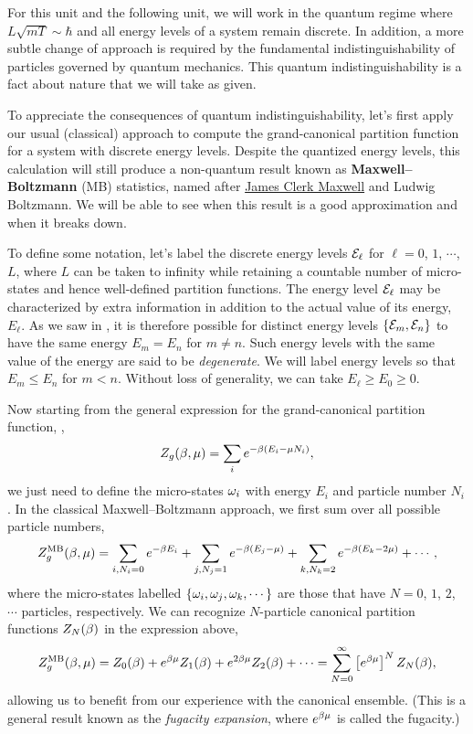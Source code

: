 For this unit and the following unit, we will work in the quantum regime where $L\sqrt{mT} \sim \hbar$ and all energy levels of a system remain discrete.
In addition, a more subtle change of approach is required by the fundamental indistinguishability of particles governed by quantum mechanics.
This quantum indistinguishability is a fact about nature that we will take as given.

To appreciate the consequences of quantum indistinguishability, let's first apply our usual (classical) approach to compute the grand-canonical partition function for a system with discrete energy levels.
Despite the quantized energy levels, this calculation will still produce a non-quantum result known as \textbf{Maxwell--Boltzmann} (MB) statistics, named after \href{https://en.wikipedia.org/wiki/James_Clerk_Maxwell}{James Clerk Maxwell} and Ludwig Boltzmann.
We will be able to see when this result is a good approximation and when it breaks down.

To define some notation, let's label the discrete energy levels $\mathcal E_{\ell}$ for $\ell = 0$, $1$, $\cdots$, $L$, where $L$ can be taken to infinity while retaining a countable number of micro-states and hence well-defined partition functions.
The energy level $\mathcal E_{\ell}$ may be characterized by extra information in addition to the actual value of its energy, $E_{\ell}$.
As we saw in , it is therefore possible for distinct energy levels $\left\{\mathcal E_m, \mathcal E_n\right\}$ to have the same energy $E_m = E_n$ for $m \neq n$.
Such energy levels with the same value of the energy are said to be \textit{degenerate}.
We will label energy levels so that $E_m \leq E_n$ for $m < n$.
Without loss of generality, we can take $E_{\ell} \geq E_0 \geq 0$.

Now starting from the general expression for the grand-canonical partition function, ,
\begin{equation*}
  Z_g(\beta, \mu) = \sum_i e^{-\beta (E_i - \mu N_i)},
\end{equation*}
we just need to define the micro-states $\omega_i$ with energy $E_i$ and particle number $N_i$.
In the classical Maxwell--Boltzmann approach, we first sum over all possible particle numbers,
\begin{equation*}
  Z_g^{\text{MB}}(\beta, \mu) = \sum_{i, N_i = 0} e^{-\beta E_i} + \sum_{j, N_j = 1} e^{-\beta (E_j - \mu)} + \sum_{k, N_k = 2} e^{-\beta (E_k - 2\mu)} + \cdots,
\end{equation*}
where the micro-states labelled $\left\{\omega_i, \omega_j, \omega_k, \cdots\right\}$ are those that have $N = 0$, $1$, $2$, $\cdots$ particles, respectively.
We can recognize $N$-particle canonical partition functions $Z_N(\beta)$ in the expression above,
\begin{equation}
  \label{eq:fugacity_exp}
  Z_g^{\text{MB}}(\beta, \mu) = Z_0(\beta) + e^{\beta\mu} Z_1(\beta) + e^{2\beta\mu} Z_2(\beta) + \cdots = \sum_{N = 0}^{\infty} \left[e^{\beta\mu}\right]^N Z_N(\beta),
\end{equation}
allowing us to benefit from our experience with the canonical ensemble.
(This is a general result known as the \textit{fugacity expansion}, where $e^{\beta\mu}$ is called the fugacity.)

